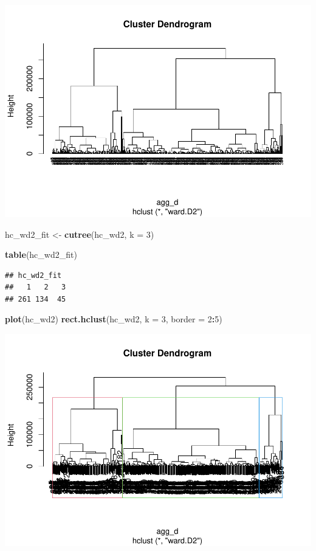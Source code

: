 \documentclass[
  english,
  man]{apa6}
\newenvironment{Shaded}{\begin{snugshade}}{\end{snugshade}}
\newcommand{\DataTypeTok}[1]{\textcolor[rgb]{0.13,0.29,0.53}{#1}}
\newcommand{\DecValTok}[1]{\textcolor[rgb]{0.00,0.00,0.81}{#1}}
\newcommand{\KeywordTok}[1]{\textcolor[rgb]{0.13,0.29,0.53}{\textbf{#1}}}
\newcommand{\NormalTok}[1]{#1}
\newcommand{\OperatorTok}[1]{\textcolor[rgb]{0.81,0.36,0.00}{\textbf{#1}}}
\newcommand{\StringTok}[1]{\textcolor[rgb]{0.31,0.60,0.02}{#1}}
\begin{document}
\includegraphics{MSDS680-Week-6-Kmeans-and-HCA_files/figure-latex/ward2-1.pdf}

\begin{Shaded}
\begin{Highlighting}[]
\NormalTok{hc_wd2_fit <-}\StringTok{ }\KeywordTok{cutree}\NormalTok{(hc_wd2, }\DataTypeTok{k =} \DecValTok{3}\NormalTok{)}

\KeywordTok{table}\NormalTok{(hc_wd2_fit)}
\end{Highlighting}
\end{Shaded}

\begin{verbatim}
## hc_wd2_fit
##   1   2   3 
## 261 134  45
\end{verbatim}

\begin{Shaded}
\begin{Highlighting}[]
\KeywordTok{plot}\NormalTok{(hc_wd2)}
\KeywordTok{rect.hclust}\NormalTok{(hc_wd2, }\DataTypeTok{k =} \DecValTok{3}\NormalTok{, }\DataTypeTok{border =} \DecValTok{2}\OperatorTok{:}\DecValTok{5}\NormalTok{)}
\end{Highlighting}
\end{Shaded}

\includegraphics{MSDS680-Week-6-Kmeans-and-HCA_files/figure-latex/ward2-2.pdf}
\end{document}
